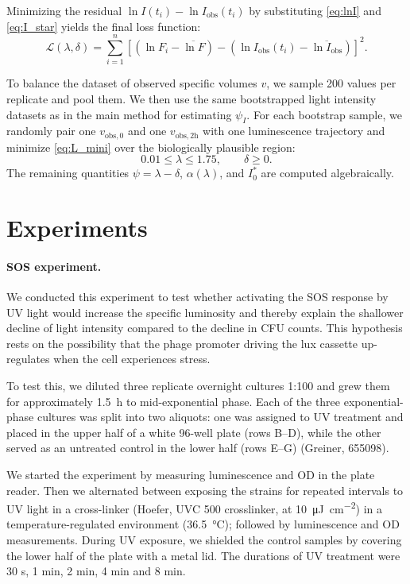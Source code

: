 Minimizing the residual $\ln I(t_i) - \ln I_{\mathrm{obs}}(t_i)$ by substituting \eqref{eq:lnI} and \eqref{eq:I_star} yields the final loss function:
\begin{equation}
  \label{eq:L_mini}
  \mathcal{L}(\lambda, \delta) =
  \sum_{i=1}^{n} \left[
    \left( \ln F_i - \overline{\ln F} \right) -
    \left( \ln I_{\mathrm{obs}}(t_i) - \overline{\ln I_{\mathrm{obs}}} \right)
  \right]^2.
\end{equation}

To balance the dataset of observed specific volumes $v$, we sample 200 values per replicate and pool them.
We then use the same bootstrapped light intensity datasets as in the main method for estimating $\psi_I$.
For each bootstrap sample, we randomly pair one $v_{\mathrm{obs},0}$ and one $v_{\mathrm{obs},2\mathrm h}$ with one luminescence trajectory and minimize \eqref{eq:L_mini} over the biologically plausible region:
\[
  0.01 \le \lambda \le 1.75, \qquad \delta \ge 0.
\]
The remaining quantities $\psi = \lambda - \delta$, $\alpha(\lambda)$, and $I_0^\ast$ are computed algebraically.

\section{Experiments}\label{sec:experiments}

\paragraph{SOS experiment.}
We conducted this experiment to test whether activating the SOS response by UV light would increase the specific luminosity and thereby explain the shallower decline of light intensity compared to the decline in CFU counts.
This hypothesis rests on the possibility that the phage promoter driving the lux cassette up-regulates when the cell experiences stress.

To test this, we diluted three replicate overnight cultures 1:100 and grew them for approximately \SI{1.5}{\hour} to mid-exponential phase.
Each of the three exponential-phase cultures was split into two aliquots: one was assigned to UV treatment and placed in the upper half of a white 96-well plate (rows B--D), while the other served as an untreated control in the lower half (rows E--G) (Greiner, 655098).

We started the experiment by measuring luminescence and OD in the plate reader.
Then we alternated between exposing the strains for repeated intervals to UV light in a cross-linker (Hoefer, UVC 500 crosslinker, at \SI{10}{\micro\joule\per\centi\meter\squared}) in a temperature-regulated environment (\SI{36.5}{\celsius}); followed by luminescence and OD measurements.
During UV exposure, we shielded the control samples by covering the lower half of the plate with a metal lid.
The durations of UV treatment were 30 s, 1 min, 2 min, 4 min and 8 min.

